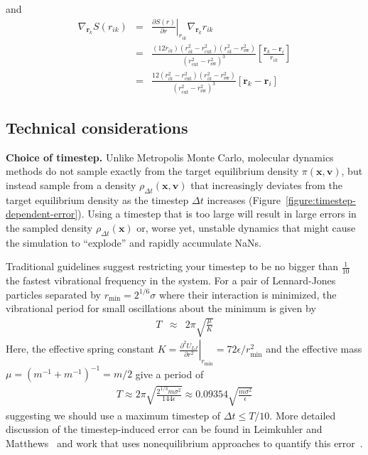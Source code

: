 \documentclass[aip,jcp,preprint,superscriptaddress,floatfix]{revtex4-1}
\newcommand{\x}{\mathbf{x}}
\newcommand{\vel}{\mathbf{v}}
\begin{document}
and
\begin{eqnarray}
\nabla_{\mathbf{r}_k} S(r_{ik}) &=& \left. \frac{\partial S(r)}{\partial r} \right|_{r_{ik}} \nabla_{\mathbf{r}_k} r_{ik}  \\
&=&\frac{(12 r_{ik}) (r_{ik}^2 - r_\mathrm{cut}^2) (r_{ik}^2 - r_\mathrm{sw}^2)}{(r_\mathrm{cut}^2 - r_\mathrm{sw}^2)^3} \left[ \frac{\mathbf{r}_k - \mathbf{r}_i}{r_{ik}} \right] \\
&=&\frac{12 (r_{ik}^2 - r_\mathrm{cut}^2) (r_{ik}^2 - r_\mathrm{sw}^2)}{(r_\mathrm{cut}^2 - r_\mathrm{sw}^2)^3} \left[ \mathbf{r}_k - \mathbf{r}_i \right] 
\end{eqnarray}

\subsection{Technical considerations}


\textbf{Choice of timestep.} 
Unlike Metropolis Monte Carlo, molecular dynamics methods do not sample exactly from the target equilibrium density $\pi(\x,\vel)$, but instead sample from a density $\rho_{\Delta t}(\x,\vel)$ that increasingly deviates from the target equilibrium density as the timestep $\Delta t$ increases (Figure~\ref{figure:timestep-dependent-error}).
Using a timestep that is too large will result in large errors in the sampled density $\rho_{\Delta t}(\x)$ or, worse yet, unstable dynamics that might cause the simulation to ``explode''  and rapidly accumulate NaNs.

Traditional guidelines suggest restricting your timestep to be no bigger than $\frac{1}{10}$ the fastest vibrational frequency in the system.
For a pair of Lennard-Jones particles separated by $r_\mathrm{min} = 2^{1/6} \sigma$ where their interaction is minimized, the vibrational period for small oscillations about the minimum is given by
\begin{eqnarray}
T &\approx& 2 \pi \sqrt{ \frac{\mu}{K} } 
\end{eqnarray}
Here, the effective spring constant $K = \left. \frac{\partial^2 U_{LJ}}{\partial r^2} \right|_{r_\mathrm{min}} = 72 \epsilon / r_\mathrm{min}^2$ and the effective mass $\mu = (m^{-1} + m^{-1})^{-1} = m/2$ give a period of 
\begin{eqnarray}
T \approx 2 \pi \sqrt{\frac{2^{1/3} m \sigma^2}{144 \epsilon}} \approx 0.09354 \sqrt{\frac{m \sigma^2}{\epsilon}}
\end{eqnarray}
suggesting we should use a maximum timestep of $\Delta t \le T/10$.
More detailed discussion of the timestep-induced error can be found in Leimkuhler and Matthews~\cite{LeimkuhlerMatthewsBook} and work that uses nonequilibrium approaches to quantify this error~\cite{VVVR}.
\end{document}
